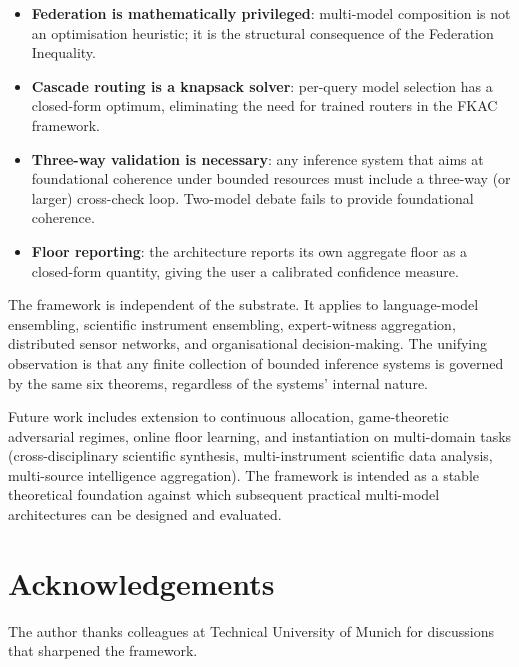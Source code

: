 \documentclass[11pt,twocolumn,a4paper]{article}
\theoremstyle{definition}
\theoremstyle{remark}
\begin{document}
\begin{itemize}[leftmargin=*,nosep]
\item \textbf{Federation is mathematically privileged}: multi-model composition is not an optimisation heuristic; it is the structural consequence of the Federation Inequality.
\item \textbf{Cascade routing is a knapsack solver}: per-query model selection has a closed-form optimum, eliminating the need for trained routers in the FKAC framework.
\item \textbf{Three-way validation is necessary}: any inference system that aims at foundational coherence under bounded resources must include a three-way (or larger) cross-check loop. Two-model debate fails to provide foundational coherence.
\item \textbf{Floor reporting}: the architecture reports its own aggregate floor as a closed-form quantity, giving the user a calibrated confidence measure.
\end{itemize}

The framework is independent of the substrate. It applies to language-model ensembling, scientific instrument ensembling, expert-witness aggregation, distributed sensor networks, and organisational decision-making. The unifying observation is that any finite collection of bounded inference systems is governed by the same six theorems, regardless of the systems' internal nature.

Future work includes extension to continuous allocation, game-theoretic adversarial regimes, online floor learning, and instantiation on multi-domain tasks (cross-disciplinary scientific synthesis, multi-instrument scientific data analysis, multi-source intelligence aggregation). The framework is intended as a stable theoretical foundation against which subsequent practical multi-model architectures can be designed and evaluated.


\section*{Acknowledgements}

The author thanks colleagues at Technical University of Munich for discussions that sharpened the framework.




\end{document}
